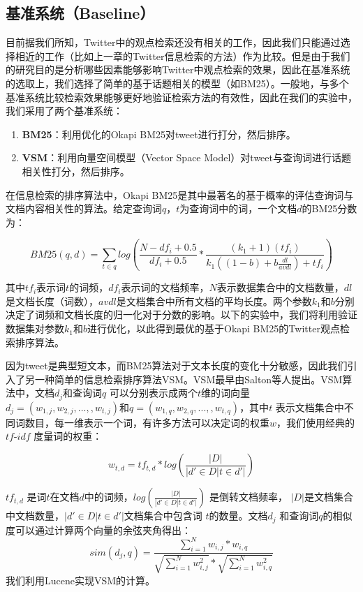 \subsection{基准系统（Baseline）}
\label{Baseline}
目前据我们所知，Twitter中的观点检索还没有相关的工作，因此我们只能通过选择相近的工作（比如上一章的Twitter信息检索的方法）作为比较。但是由于我们的研究目的是分析哪些因素能够影响Twitter中观点检索的效果，因此在基准系统的选取上，我们选择了简单的基于话题相关的模型（如BM25）。一般地，与多个基准系统比较检索效果能够更好地验证检索方法的有效性，因此在我们的实验中，我们采用了两个基准系统：
  \begin{enumerate}
\item{\textbf{BM25}}：利用优化的Okapi BM25对tweet进行打分，然后排序。
\item{\textbf{VSM}}：利用向量空间模型（Vector Space  Model）对tweet与查询词进行话题相关性打分，然后排序。
\end{enumerate}

在信息检索的排序算法中，Okapi BM25是其中最著名的基于概率的评估查询词与文档内容相关性的算法。给定查询词$q$，$t$为查询词中的词，一个文档$d$的BM25分数为：

$$BM25(q,d)=\sum_{t\in q}log(\frac{N-df_i+0.5}{df_i+0.5}*\frac{(k_1+1)(tf_i)}{k_1((1-b)+b\frac{dl}{avdl})+tf_i})$$

其中$tf_i$表示词$t$的词频，$df_i$表示词的文档频率，$N$表示数据集合中的文档数量，$dl$是文档长度（词数），$avdl$是文档集合中所有文档的平均长度。两个参数$k_1$和$b$分别决定了词频和文档长度的归一化对于分数的影响。以下的实验中，我们将利用验证数据集对参数$k_1$和$b$进行优化，以此得到最优的基于Okapi BM25的Twitter观点检索排序算法。

因为tweet是典型短文本，而BM25算法对于文本长度的变化十分敏感，因此我们引入了另一种简单的信息检索排序算法VSM。VSM最早由Salton等人提出。VSM算法中，文档$d_j$和查询词$q$ 可以分别表示成两个$t$维的词向量$d_j= (w_{1,j},w_{2,j},...,,w_{t,j})$和$q= (w_{1,q},w_{2,q},...,,w_{t,q})$，其中$t$ 表示文档集合中不同词数目，每一维表示一个词，有许多方法可以决定词的权重$w$，我们使用经典的$tf$-$idf$ 度量词的权重：

$$w_{t,d}=tf_{t,d}*log(\frac{|D|}{|d'\in D|t\in d'|})$$

$tf_{t,d}$ 是词$t$在文档$d$中的词频，$log(\frac{|D|}{|d'\in D|t\in d'|})$ 是倒转文档频率， $|D|$是文档集合中文档数量，$|d'\in D|t\in d'|$文档集合中包含词 $t$的数量。文档$d_j$ 和查询词$q$的相似度可以通过计算两个向量的余弦夹角得出：
$$sim(d_j, q)=\frac{\sum_{i=1}^Nw_{i,j}*w_{i,q}}{\sqrt{\sum_{i=1}^Nw_{i,j}^2}*\sqrt{\sum_{i=1}^Nw_{i,q}^2}}$$
我们利用Lucene实现VSM的计算。

